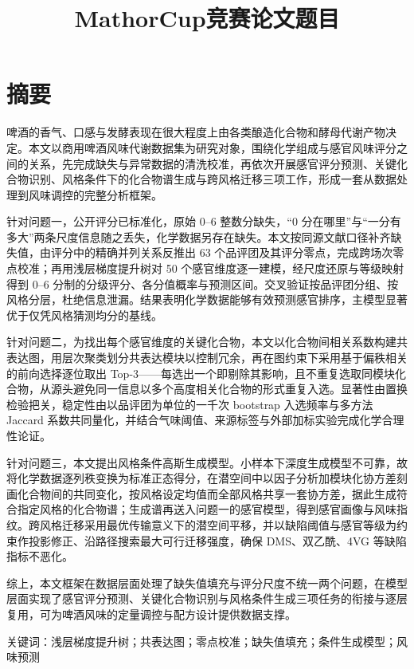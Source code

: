 \documentclass[12pt,a4paper]{article}
\begin{document}
\title{MathorCup竞赛论文题目}
\author{}
\date{}
\maketitle

\section*{摘要}

啤酒的香气、口感与发酵表现在很大程度上由各类酿造化合物和酵母代谢产物决定。本文以商用啤酒风味代谢数据集为研究对象，围绕化学组成与感官风味评分之间的关系，先完成缺失与异常数据的清洗校准，再依次开展感官评分预测、关键化合物识别、风格条件下的化合物谱生成与跨风格迁移三项工作，形成一套从数据处理到风味调控的完整分析框架。

针对问题一，公开评分已标准化，原始 0--6 整数分缺失，``0 分在哪里''与``一分有多大''两条尺度信息随之丢失，化学数据另存在缺失。本文按同源文献口径补齐缺失值，由评分中的精确并列关系反推出 63 个品评团及其评分零点，完成跨场次零点校准；再用浅层梯度提升树对 50 个感官维度逐一建模，经尺度还原与等级映射得到 0--6 分制的分级评分、各分值概率与预测区间。交叉验证按品评团分组、按风格分层，杜绝信息泄漏。结果表明化学数据能够有效预测感官排序，主模型显著优于仅凭风格猜测均分的基线。

针对问题二，为找出每个感官维度的关键化合物，本文以化合物间相关系数构建共表达图，用层次聚类划分共表达模块以控制冗余，再在图约束下采用基于偏秩相关的前向选择逐位取出 Top-3——每选出一个即剔除其影响，且不重复选取同模块化合物，从源头避免同一信息以多个高度相关化合物的形式重复入选。显著性由置换检验把关，稳定性由以品评团为单位的一千次 bootstrap 入选频率与多方法 Jaccard 系数共同量化，并结合气味阈值、来源标签与外部加标实验完成化学合理性论证。

针对问题三，本文提出风格条件高斯生成模型。小样本下深度生成模型不可靠，故将化学数据逐列秩变换为标准正态得分，在潜空间中以因子分析加模块化协方差刻画化合物间的共同变化，按风格设定均值而全部风格共享一套协方差，据此生成符合指定风格的化合物谱；生成谱再送入问题一的感官模型，得到感官画像与风味指纹。跨风格迁移采用最优传输意义下的潜空间平移，并以缺陷阈值与感官等级为约束作投影修正、沿路径搜索最大可行迁移强度，确保 DMS、双乙酰、4VG 等缺陷指标不恶化。

综上，本文框架在数据层面处理了缺失值填充与评分尺度不统一两个问题，在模型层面实现了感官评分预测、关键化合物识别与风格条件生成三项任务的衔接与逐层复用，可为啤酒风味的定量调控与配方设计提供数据支撑。

关键词：浅层梯度提升树；共表达图；零点校准；缺失值填充；条件生成模型；风味预测
\tableofcontents
\newpage
\end{document}

